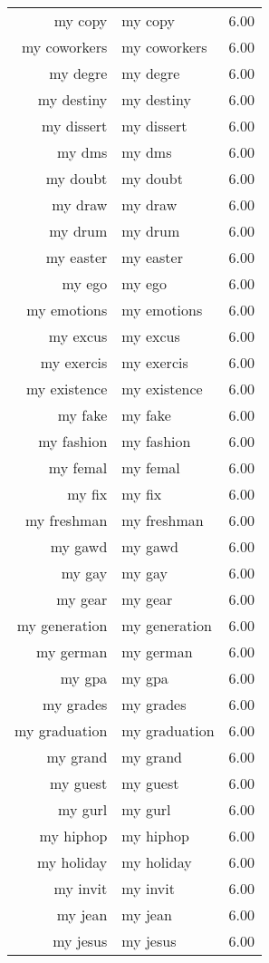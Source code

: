 \begin{table}[ht]
\begin{tabular}{rlr}
  my copy & my copy & 6.00 \\ 
  my coworkers & my coworkers & 6.00 \\ 
  my degre & my degre & 6.00 \\ 
  my destiny & my destiny & 6.00 \\ 
  my dissert & my dissert & 6.00 \\ 
  my dms & my dms & 6.00 \\ 
  my doubt & my doubt & 6.00 \\ 
  my draw & my draw & 6.00 \\ 
  my drum & my drum & 6.00 \\ 
  my easter & my easter & 6.00 \\ 
  my ego & my ego & 6.00 \\ 
  my emotions & my emotions & 6.00 \\ 
  my excus & my excus & 6.00 \\ 
  my exercis & my exercis & 6.00 \\ 
  my existence & my existence & 6.00 \\ 
  my fake & my fake & 6.00 \\ 
  my fashion & my fashion & 6.00 \\ 
  my femal & my femal & 6.00 \\ 
  my fix & my fix & 6.00 \\ 
  my freshman & my freshman & 6.00 \\ 
  my gawd & my gawd & 6.00 \\ 
  my gay & my gay & 6.00 \\ 
  my gear & my gear & 6.00 \\ 
  my generation & my generation & 6.00 \\ 
  my german & my german & 6.00 \\ 
  my gpa & my gpa & 6.00 \\ 
  my grades & my grades & 6.00 \\ 
  my graduation & my graduation & 6.00 \\ 
  my grand & my grand & 6.00 \\ 
  my guest & my guest & 6.00 \\ 
  my gurl & my gurl & 6.00 \\ 
  my hiphop & my hiphop & 6.00 \\ 
  my holiday & my holiday & 6.00 \\ 
  my invit & my invit & 6.00 \\ 
  my jean & my jean & 6.00 \\ 
  my jesus & my jesus & 6.00 \\ 

\end{tabular}
\end{table}
